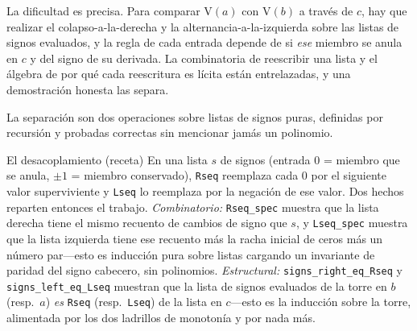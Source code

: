 \documentclass[11pt]{article}
\newcommand{\lean}[1]{\texttt{#1}}
\newcommand{\V}{\mathrm{V}}
\begin{document}
La dificultad es precisa. Para comparar $\V(a)$ con $\V(b)$ a trav\'es de $c$, hay que realizar el
colapso-a-la-derecha y la alternancia-a-la-izquierda sobre las listas de signos evaluados, y la regla
de cada entrada depende de si \emph{ese} miembro se anula en $c$ y del signo de su derivada. La
combinatoria de reescribir una lista y el \'algebra de por qu\'e cada reescritura es l\'icita est\'an
entrelazadas, y una demostraci\'on honesta las separa.

La separaci\'on son dos operaciones sobre listas de signos puras, definidas por recursi\'on y probadas
correctas sin mencionar jam\'as un polinomio.
\begin{recipebox}{El desacoplamiento (receta)}
En una lista $s$ de signos (entrada $0$ = miembro que se anula, $\pm1$ = miembro conservado),
\lean{Rseq} reemplaza cada $0$ por el siguiente valor superviviente y \lean{Lseq} lo reemplaza por la
negaci\'on de ese valor. Dos hechos reparten entonces el trabajo. \emph{Combinatorio:} \lean{Rseq\_spec}
muestra que la lista derecha tiene el mismo recuento de cambios de signo que $s$, y \lean{Lseq\_spec}
muestra que la lista izquierda tiene ese recuento m\'as la racha inicial de ceros m\'as un n\'umero
par---esto es inducci\'on pura sobre listas cargando un invariante de paridad del signo cabecero, sin
polinomios. \emph{Estructural:} \lean{signs\_right\_eq\_Rseq} y \lean{signs\_left\_eq\_Lseq} muestran
que la lista de signos evaluados de la torre en $b$ (resp.\ $a$) \emph{es} \lean{Rseq} (resp.\
\lean{Lseq}) de la lista en $c$---esto es la inducci\'on sobre la torre, alimentada por los dos
ladrillos de monoton\'ia y por nada m\'as.
\end{recipebox}
\end{document}
